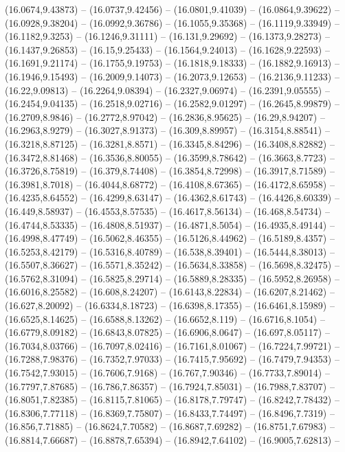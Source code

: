 {(16.0674,9.43873) -- (16.0737,9.42456) -- (16.0801,9.41039) -- (16.0864,9.39622) -- (16.0928,9.38204) -- (16.0992,9.36786) -- (16.1055,9.35368) -- (16.1119,9.33949) -- (16.1182,9.3253) -- (16.1246,9.31111) -- (16.131,9.29692) -- (16.1373,9.28273) --
(16.1437,9.26853) -- (16.15,9.25433) -- (16.1564,9.24013) -- (16.1628,9.22593) -- (16.1691,9.21174) -- (16.1755,9.19753) -- (16.1818,9.18333) -- (16.1882,9.16913) -- (16.1946,9.15493) -- (16.2009,9.14073) -- (16.2073,9.12653) -- (16.2136,9.11233) --
(16.22,9.09813) -- (16.2264,9.08394) -- (16.2327,9.06974) -- (16.2391,9.05555) -- (16.2454,9.04135) -- (16.2518,9.02716) -- (16.2582,9.01297) -- (16.2645,8.99879) -- (16.2709,8.9846) -- (16.2772,8.97042) -- (16.2836,8.95625) -- (16.29,8.94207) --
(16.2963,8.9279) -- (16.3027,8.91373) -- (16.309,8.89957) -- (16.3154,8.88541) -- (16.3218,8.87125) -- (16.3281,8.8571) -- (16.3345,8.84296) -- (16.3408,8.82882) -- (16.3472,8.81468) -- (16.3536,8.80055) -- (16.3599,8.78642) -- (16.3663,8.7723) --
(16.3726,8.75819) -- (16.379,8.74408) -- (16.3854,8.72998) -- (16.3917,8.71589) -- (16.3981,8.7018) -- (16.4044,8.68772) -- (16.4108,8.67365) -- (16.4172,8.65958) -- (16.4235,8.64552) -- (16.4299,8.63147) -- (16.4362,8.61743) -- (16.4426,8.60339) --
(16.449,8.58937) -- (16.4553,8.57535) -- (16.4617,8.56134) -- (16.468,8.54734) -- (16.4744,8.53335) -- (16.4808,8.51937) -- (16.4871,8.5054) -- (16.4935,8.49144) -- (16.4998,8.47749) -- (16.5062,8.46355) -- (16.5126,8.44962) -- (16.5189,8.4357) --
(16.5253,8.42179) -- (16.5316,8.40789) -- (16.538,8.39401) -- (16.5444,8.38013) -- (16.5507,8.36627) -- (16.5571,8.35242) -- (16.5634,8.33858) -- (16.5698,8.32475) -- (16.5762,8.31094) -- (16.5825,8.29714) -- (16.5889,8.28335) -- (16.5952,8.26958)
-- (16.6016,8.25582) -- (16.608,8.24207) -- (16.6143,8.22834) -- (16.6207,8.21462) -- (16.627,8.20092) -- (16.6334,8.18723) -- (16.6398,8.17355) -- (16.6461,8.15989) -- (16.6525,8.14625) -- (16.6588,8.13262) -- (16.6652,8.119) -- (16.6716,8.1054) --
(16.6779,8.09182) -- (16.6843,8.07825) -- (16.6906,8.0647) -- (16.697,8.05117) -- (16.7034,8.03766) -- (16.7097,8.02416) -- (16.7161,8.01067) -- (16.7224,7.99721) -- (16.7288,7.98376) -- (16.7352,7.97033) -- (16.7415,7.95692) -- (16.7479,7.94353) --
(16.7542,7.93015) -- (16.7606,7.9168) -- (16.767,7.90346) -- (16.7733,7.89014) -- (16.7797,7.87685) -- (16.786,7.86357) -- (16.7924,7.85031) -- (16.7988,7.83707) -- (16.8051,7.82385) -- (16.8115,7.81065) -- (16.8178,7.79747) -- (16.8242,7.78432) --
(16.8306,7.77118) -- (16.8369,7.75807) -- (16.8433,7.74497) -- (16.8496,7.7319) -- (16.856,7.71885) -- (16.8624,7.70582) -- (16.8687,7.69282) -- (16.8751,7.67983) -- (16.8814,7.66687) -- (16.8878,7.65394) -- (16.8942,7.64102) -- (16.9005,7.62813) --
}
